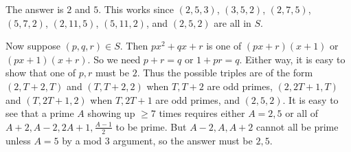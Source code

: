 The answer is $2$ and $5$. This works since $(2,5,3)$, $(3,5,2)$, $(2,7,5)$, $(5,7,2)$, $(2,11,5)$, $(5,11,2)$, and $(2,5,2)$ are all in $S$.

Now suppose $(p,q,r)\in S$. Then $px^2+qx+r$ is one of $(px+r)(x+1)$ or $(px+1)(x+r)$. So we need $p+r=q$ or $1+pr=q$. Either way, it is easy to show that one of $p,r$ must be $2$. Thus the possible triples are of the form $(2,T+2,T)$ and $(T,T+2,2)$ when $T,T+2$ are odd primes, $(2,2T+1,T)$ and $(T,2T+1,2)$ when $T,2T+1$ are odd primes, and $(2,5,2)$. It is easy to see that a prime $A$ showing up $\geq7$ times requires either $A=2,5$ or all of $A+2,A-2,2A+1,\frac{A-1}{2}$ to be prime. But $A-2,A,A+2$ cannot all be prime unless $A=5$ by a mod $3$ argument, so the answer must be $2,5$.